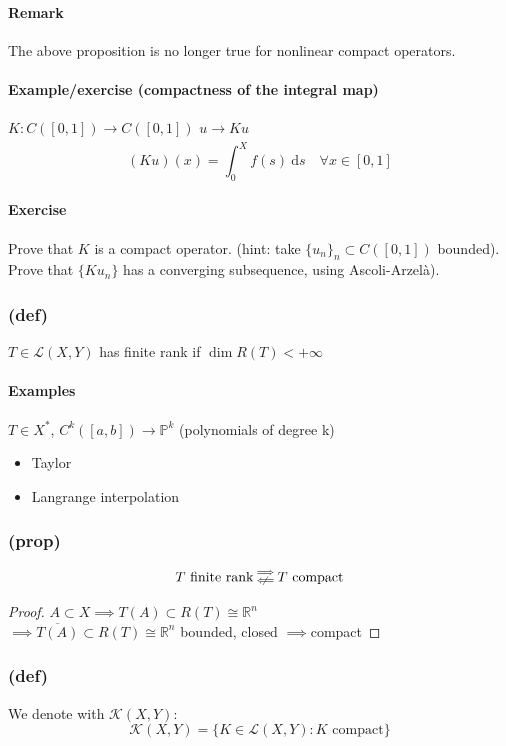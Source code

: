 \paragraph{Remark}
The above proposition is no longer true for nonlinear compact operators.
\paragraph{Example/exercise (compactness of the integral map)}
$K:C([0,1])\xrightarrow[\quad]{}C([0,1])$
$u\xrightarrow[\quad]{}Ku$
$$(Ku)(x)=\int_0^Xf(s)\ \mathrm ds\quad \forall x\in [0,1]$$
\paragraph{Exercise}
Prove that $K$ is a compact operator. (hint: take $\{u_n\}_n\subset C([0,1])$ bounded).\\Prove that $\{K u_n\}$ has a converging subsequence, using Ascoli-Arzelà).
\subsubsection{(def)}
$T\in \mathcal L(X,Y)$ has finite rank if $\dim R(T)<+\infty$
\paragraph{Examples}
$T\in X^*$, $C^k([a,b])\to \mathbb P^k$ (polynomials of degree k)
\begin{itemize}
    \item Taylor
    \item Langrange interpolation
\end{itemize}
\subsubsection{(prop)}
$$T \text{ finite rank}\substack{\implies\\\centernot \impliedby} T\text{ compact}$$
\begin{proof}
    $A\subset X \implies T(A)\subset R(T) \cong \mathbb R^n$\\
    $\implies \overline{T(A)}\subset R(T)\cong \mathbb R^n$ bounded, closed $\implies $compact
\end{proof}
\subsubsection{(def)}
We denote with $\mathcal K(X,Y)$:
$$\mathcal K(X,Y)=\{ K\in \mathcal L(X,Y) : K\text{ compact}\}$$
